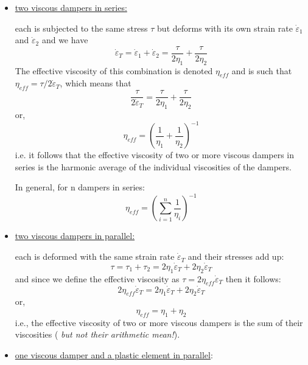 \begin{itemize}
\item \underline{two viscous dampers in series:} 

\begin{center}

\end{center}

each is subjected to the same stress $\tau$ but deforms 
with its own strain rate $\dot{\varepsilon}_1$ and $\dot{\varepsilon}_2$ and we have 
\begin{equation}
\dot{\varepsilon}_T 
= \dot{\varepsilon}_1 + \dot{\varepsilon}_2
= \frac{\tau}{2\eta_1} + \frac{\tau}{2\eta_2}
\end{equation}
The effective viscosity of this combination is denoted $\eta_{eff}$ and is such that 
$\eta_{eff}=\tau/2\dot{\varepsilon}_T$, which means that 
\[
\frac{\tau}{2\dot{\varepsilon}_T} = \frac{\tau}{2\eta_1} + \frac{\tau}{2\eta_2}
\]
or, 
\[
\eta_{eff}= \left( \frac{1}{\eta_1} + \frac{1}{\eta_2} \right)^{-1}
\]
i.e. it follows that the effective viscosity of two or more viscous dampers in series is the harmonic 
average of the individual viscosities of the dampers.

In general, for n dampers in series:
\[
\eta_{eff}= \left( \sum_{i=1}^n \frac{1}{\eta_i} \right)^{-1}
\]




\item \underline{two viscous dampers in parallel:}

\begin{center}

\end{center}
 
each is deformed with the same strain rate $\dot{\varepsilon}_T$
and their stresses add up:
\[
\tau = \tau_1 + \tau_2 = 2 \eta_1 \dot{\varepsilon}_T  + 2 \eta_2 \dot{\varepsilon}_T
\]
and since we define the effective viscosity as $\tau = 2 \eta_{eff} \dot{\varepsilon}_T$ then it follows:
\[
2 \eta_{eff} \dot{\varepsilon}_T = 2 \eta_1 \dot{\varepsilon}_T  + 2 \eta_2 \dot{\varepsilon}_T
\]
or, 
\[
\eta_{eff} = \eta_1 + \eta_2 
\]
i.e., the effective viscosity of two or more viscous dampers is the sum of their viscosities ({\sl 
but not their arithmetic mean!}).


\item \underline{one viscous damper and a plastic element in parallel}:
\begin{center}

\end{center}


\end{itemize}
